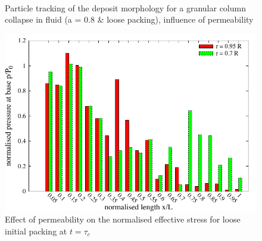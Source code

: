 \begin{figure}
\centering
{}\\
\caption{Particle tracking of the deposit morphology
for a granular column collapse in fluid (a = 0.8 \& loose packing), influence 
of permeability}
\label{fig:Loose_a08_permeability}
\end{figure}

\begin{figure}
\centering
\includegraphics[width=0.97\columnwidth]{a08/effective_stress_a08}
\caption{Effect of permeability on the normalised effective stress for loose 
initial packing at $t = \tau_c$}
\label{fig:effective_stress_a08}
\end{figure}


